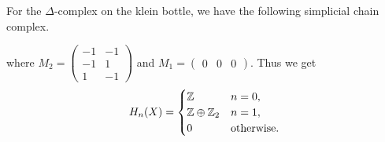 \begin{example}
 For the $\Delta$-complex on the klein bottle, we have the following simplicial chain complex.
  \begin{center}
  \end{center}
  where
  $
    M_2 =
    \begin{pmatrix}
      -1 & -1 \\ -1 & 1 \\ 1 & -1
    \end{pmatrix}
  $
  and
  $
    M_1 =
    \begin{pmatrix}
      0 & 0 & 0
    \end{pmatrix}
  $.
  Thus we get
  \[
    H_n(X) =
    \begin{cases}
      \mathbb{Z}             & n = 0,            \\
      \mathbb{Z} \oplus \mathbb{Z}_2 & n = 1,            \\
      0              & \text{otherwise}.
    \end{cases}
  \]

\end{example}